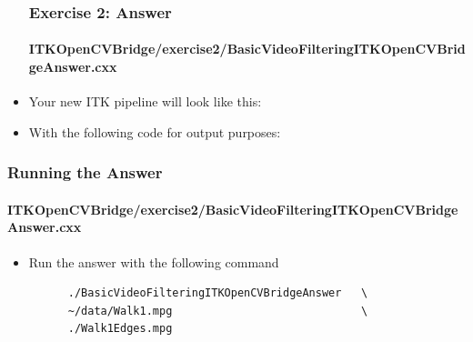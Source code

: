 \begin{frame}
\begin{itemize}
\frametitle{Exercise 2: Answer}
\framesubtitle{ITKOpenCVBridge/exercise2/BasicVideoFilteringITKOpenCVBridgeAnswer.cxx}
\item Your new ITK pipeline will look like this:
\end{itemize}
\end{frame}

\begin{frame}
\begin{itemize}
\frametitle{Exercise 2: Answer}
\framesubtitle{ITKOpenCVBridge/exercise2/BasicVideoFilteringITKOpenCVBridgeAnswer.cxx}
\item With the following code for output purposes:
\end{itemize}
\end{frame}

\begin{frame}[fragile]
\frametitle{Running the Answer}
\framesubtitle{ITKOpenCVBridge/exercise2/BasicVideoFilteringITKOpenCVBridgeAnswer.cxx}
\begin{itemize}
\item Run the answer with the following command
\begin{verbatim}
      ./BasicVideoFilteringITKOpenCVBridgeAnswer   \
      ~/data/Walk1.mpg                             \
      ./Walk1Edges.mpg
\end{verbatim}
\end{itemize}
\end{frame}



